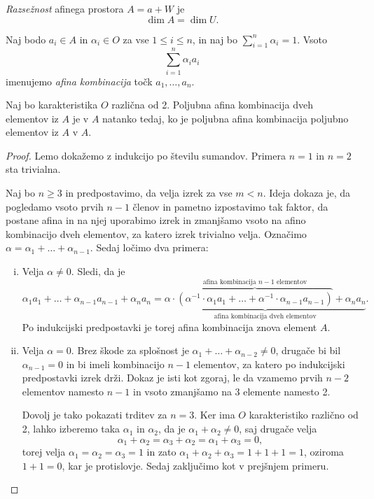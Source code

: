 \begin{definicija}
    \emph{Razsežnost} afinega prostora $A = a + W$ je
    \[
    \dim A = \dim U.
    \]
\end{definicija}

\begin{definicija}
    Naj bodo $a_{i} \in A$ in $\alpha_{i} \in O$ za vse $1 \leq i \leq n$, in naj bo $\sum_{i=1}^{n} \alpha_{i} = 1$. Vsoto 
    \[
    \sum_{i=1}^{n} \alpha_{i} a_{i}
    \]
    imenujemo \emph{afina kombinacija} točk $a_1,\dots, a_n$.
\end{definicija}

\begin{lema}
    Naj bo karakteristika $O$ različna od 2. Poljubna afina kombinacija dveh elementov iz $A$ je v $A$ natanko tedaj, ko je poljubna afina kombinacija poljubno elementov iz $A$ v $A$.
\end{lema}

\begin{proof}
    Lemo dokažemo z indukcijo po številu sumandov. Primera $n = 1$ in $n = 2$ sta trivialna.
    
    Naj bo $n \geq 3$ in predpostavimo, da velja izrek za vse $m < n$. Ideja dokaza je, da pogledamo vsoto prvih $n - 1$ členov in pametno izpostavimo tak faktor, da postane afina in na njej uporabimo izrek
    in zmanjšamo vsoto na afino kombinacijo dveh elementov, za katero izrek trivialno velja.
    Označimo $\alpha = \alpha_1 + \dots + \alpha_{n-1}$. Sedaj ločimo dva primera:
   
    \begin{enumerate}[i)]
    \item Velja $\alpha \neq 0.$ Sledi, da je
    \[
        \alpha_1 a_1 + \dots + \alpha_{n-1} a_{n-1} + \alpha_n a_n = 
        \underbrace{\alpha \cdot \overbrace{(\alpha^{-1} \cdot \alpha_1 a_1 + \dots + \alpha^{-1} \cdot \alpha_{n-1} a_{n-1})}^{\text{afina kombinacija $n - 1$ elementov}} + \alpha_n a_n}_{\text{afina kombinacija dveh elementov}}.
    \]
    Po indukcijski predpostavki je torej afina kombinacija znova element $A$.
    \item Velja $\alpha = 0$.
    Brez škode za splošnost je $\alpha_1 + \dots + \alpha_{n-2} \neq 0$, drugače bi bil $\alpha_{n-1} = 0$ in bi imeli kombinacijo $n-1$ elementov, za katero po indukcijski predpostavki izrek drži.
    Dokaz je isti kot zgoraj, le da vzamemo prvih $n-2$ elementov namesto $n-1$ in vsoto zmanjšamo na 3 elemente namesto 2. 
    
    Dovolj je tako pokazati trditev za $n=3$. Ker ima $O$ karakteristiko različno od 2, lahko izberemo taka $\alpha_1$ in $\alpha_2$, da je $\alpha_1 + \alpha_2 \neq 0$,
    saj drugače velja
    \[
    \alpha_1 + \alpha_2 = \alpha_3 + \alpha_2 = \alpha_1 + \alpha_3 = 0,
    \]
    torej velja $\alpha_1 = \alpha_2 = \alpha_3 = 1$ in zato $\alpha_1 + \alpha_2 + \alpha_3 = 1 + 1 + 1 = 1$, oziroma $1 + 1 = 0$, kar je protislovje. Sedaj zaključimo kot v prejšnjem primeru. \qedhere
    \end{enumerate}
\end{proof}

